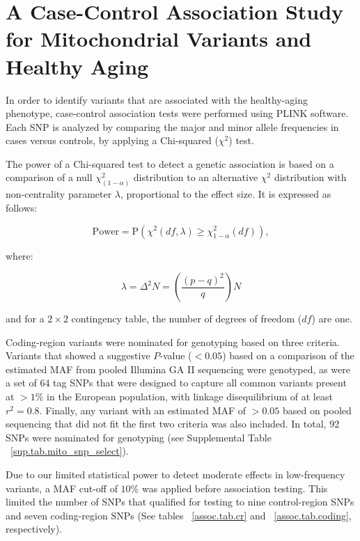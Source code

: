\chapter{A Case-Control Association Study for Mitochondrial Variants and Healthy Aging}\label{assoc}
In order to identify variants that are associated with the healthy-aging phenotype, case-control association tests were performed using PLINK software\cite{Purcell2007}.  Each SNP is analyzed by comparing the major and minor allele frequencies in cases versus controls, by applying a Chi-squared ($\chi^{2}$) test.

The power of a Chi-squared test to detect a genetic association is based on a comparison of a null $\chi^{2}_{(1-\alpha)}$ distribution to an alternative $\chi^{2}$ distribution with non-centrality parameter $\lambda$, proportional to the effect size\cite{DeBakker2005}.  It is expressed as follows:

\begin{equation}
\mathrm{Power} = \mathrm{P}(\chi^{2} (df, \lambda) \geq \chi^{2}_{1 - \alpha} (df)),
\end{equation}

\noindent where:

\begin{equation}
\lambda = \Delta^{2} N = \left( \frac{(p - q)^{2}}{q} \right) N
\end{equation}

\noindent and for a $2 \times 2$ contingency table, the number of degrees of freedom ($df$) are one.  

Coding-region variants were nominated for genotyping based on three criteria.  Variants that showed a suggestive $P$-value ($< 0.05$) based on a comparison of the estimated \ac{MAF} from pooled Illumina GA II sequencing were genotyped, as were a set of 64 tag \ac{SNP}s that were designed to capture all common variants present at $>1\%$ in the European population, with linkage disequilibrium of at least $r^{2} = 0.8$\cite{saxena2006comprehensive}.  Finally, any variant with an estimated \ac{MAF} of $> 0.05$ based on pooled sequencing that did not fit the first two criteria was also included.  In total, 92 SNPs were nominated for genotyping (see Supplemental Table ~\ref{sup.tab.mito_snp_select}). 
 
Due to our limited statistical power to detect moderate effects in low-frequency variants, a \ac{MAF} cut-off of $10\%$ was applied before association testing.  This limited the number of \ac{SNP}s that qualified for testing to nine control-region \ac{SNP}s and seven coding-region \ac{SNP}s (See tables ~\ref{assoc.tab.cr} and ~\ref{assoc.tab.coding}, respectively).


